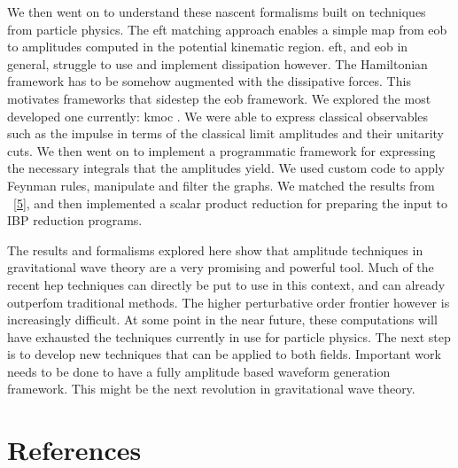 \documentclass[
  11pt,
  a4paper,
  DIV=11,
  numbers=noendperiod,
  twoside]{scrreprt}
\DeclareRobustCommand{\[}{\begin{equation}}
\DeclareRobustCommand{\]}{\end{equation}}
\begin{document}
We then went on to understand these nascent formalisms built on
techniques from particle physics. The \gls{eft} matching approach
enables a simple map from \gls{eob} to amplitudes computed in the
potential kinematic region. \gls{eft}, and \gls{eob} in general,
struggle to use and implement dissipation however. The Hamiltonian
framework has to be somehow augmented with the dissipative forces. This
motivates frameworks that sidestep the \gls{eob} framework. We explored
the most developed one currently: \gls{kmoc} . We were able to express
classical observables such as the impulse in terms of the classical
limit amplitudes and their unitarity cuts. We then went on to implement
a programmatic framework for expressing the necessary integrals that the
amplitudes yield. We used custom code to apply Feynman rules, manipulate
and filter the graphs. We matched the results from
~{[}\protect\hyperlink{ref-Kosower:2018adc}{5}{]}, and then implemented
a scalar product reduction for preparing the input to IBP reduction
programs.

The results and formalisms explored here show that amplitude techniques
in gravitational wave theory are a very promising and powerful tool.
Much of the recent \gls{hep} techniques can directly be put to use in
this context, and can already outperfom traditional methods. The higher
perturbative order frontier however is increasingly difficult. At some
point in the near future, these computations will have exhausted the
techniques currently in use for particle physics. The next step is to
develop new techniques that can be applied to both fields. Important
work needs to be done to have a fully amplitude based waveform
generation framework. This might be the next revolution in gravitational
wave theory.


\hypertarget{references}{%
\chapter*{References}\label{references}}
\end{document}
